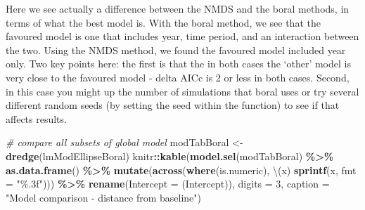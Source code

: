 \documentclass[nofonts,]{tufte-handout}
\newenvironment{Shaded}{\begin{snugshade}}{\end{snugshade}}
\newcommand{\AttributeTok}[1]{\textcolor[rgb]{0.13,0.29,0.53}{#1}}
\newcommand{\CommentTok}[1]{\textcolor[rgb]{0.56,0.35,0.01}{\textit{#1}}}
\newcommand{\DecValTok}[1]{\textcolor[rgb]{0.00,0.00,0.81}{#1}}
\newcommand{\FunctionTok}[1]{\textcolor[rgb]{0.13,0.29,0.53}{\textbf{#1}}}
\newcommand{\NormalTok}[1]{#1}
\newcommand{\OtherTok}[1]{\textcolor[rgb]{0.56,0.35,0.01}{#1}}
\newcommand{\SpecialCharTok}[1]{\textcolor[rgb]{0.81,0.36,0.00}{\textbf{#1}}}
\newcommand{\StringTok}[1]{\textcolor[rgb]{0.31,0.60,0.02}{#1}}
\begin{document}
Here we see actually a difference between the NMDS and the boral
methods, in terms of what the best model is. With the boral method, we
see that the favoured model is one that includes year, time period, and
an interaction between the two. Using the NMDS method, we found the
favoured model included year only. Two key points here: the first is
that the in both cases the `other' model is very close to the favoured
model - delta AICc is 2 or less in both cases. Second, in this case you
might up the number of simulations that boral uses or try several
different random seeds (by setting the seed within the function) to see
if that affects results.

\begin{Shaded}
\begin{Highlighting}[]
\CommentTok{\# compare all subsets of global model }
\NormalTok{modTabBoral }\OtherTok{\textless{}{-}} \FunctionTok{dredge}\NormalTok{(lmModEllipseBoral)}
\NormalTok{knitr}\SpecialCharTok{::}\FunctionTok{kable}\NormalTok{(}\FunctionTok{model.sel}\NormalTok{(modTabBoral) }\SpecialCharTok{\%\textgreater{}\%}
               \FunctionTok{as.data.frame}\NormalTok{() }\SpecialCharTok{\%\textgreater{}\%}
           \FunctionTok{mutate}\NormalTok{(}\FunctionTok{across}\NormalTok{(}\FunctionTok{where}\NormalTok{(is.numeric), }
\NormalTok{                         \textbackslash{}(x) }\FunctionTok{sprintf}\NormalTok{(x, }
                         \AttributeTok{fmt =} \StringTok{"\%.3f"}\NormalTok{))) }\SpecialCharTok{\%\textgreater{}\%}
               \FunctionTok{rename}\NormalTok{(}\AttributeTok{Intercept =} \StringTok{\textasciigrave{}}\AttributeTok{(Intercept)}\StringTok{\textasciigrave{}}\NormalTok{), }
             \AttributeTok{digits =} \DecValTok{3}\NormalTok{,}
             \AttributeTok{caption =} \StringTok{"Model comparison {-} distance from baseline"}\NormalTok{)}
\end{Highlighting}
\end{Shaded}
\end{document}
